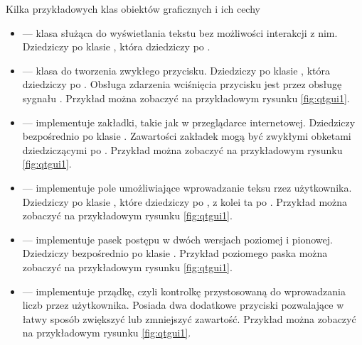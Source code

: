 \par
Kilka przykładowych klas obiektów graficznych i ich cechy
\begin{itemize}
    \item {} --- klasa służąca do wyświetlania tekstu bez możliwości interakcji z nim.
          Dziedziczy po klasie , która dziedziczy po .

    \item {} --- klasa do tworzenia zwykłego przycisku.
          Dziedziczy po klasie , która dziedziczy po .
          Obsługa zdarzenia wciśnięcia przycisku jest przez obsługę sygnału .
          Przykład można zobaczyć na przykładowym rysunku \ref{fig:qtgui1}.

    \item {} --- implementuje zakładki, takie jak w przeglądarce internetowej.
          Dziedziczy bezpośrednio po klasie .
          Zawartości zakładek mogą być zwykłymi obketami dziedziczącymi po .
          Przykład można zobaczyć na przykładowym rysunku \ref{fig:qtgui1}.

    \item {} --- implementuje pole umożliwiające wprowadzanie teksu rzez użytkownika.
          Dziedziczy po klasie , które dziedziczy po  , z kolei ta po .
          Przykład można zobaczyć na przykładowym rysunku \ref{fig:qtgui1}.

    \item {} --- implementuje pasek postępu w dwóch wersjach poziomej i pionowej.
          Dziedziczy bezpośrednio po klasie .
          Przykład poziomego paska można zobaczyć na przykładowym rysunku \ref{fig:qtgui1}.

    \item {} --- implementuje prządkę, czyli kontrolkę przystosowaną do wprowadzania liczb przez użytkownika.
          Posiada dwa dodatkowe przyciski pozwalające w łatwy sposób zwiększyć lub zmniejszyć zawartość.
          Przykład można zobaczyć na przykładowym rysunku \ref{fig:qtgui1}.

\end{itemize}